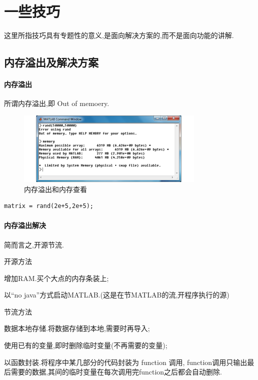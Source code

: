 \section{一些技巧}
这里所指技巧具有专题性的意义,是面向解决方案的,而不是面向功能的讲解.



\subsection{内存溢出及解决方案}

\paragraph{内存溢出}所谓内存溢出,即  Out of memoery.

\begin{figure}[htbp]
\centering
\includegraphics[width=9cm]{diagrams/memoryout.jpg}
\caption{内存溢出和内存查看}
\end{figure}

\vspace{-1.0cm}
\begin{lstlisting}[caption = 生成随机矩阵]
matrix = rand(2e+5,2e+5);
\end{lstlisting}



\paragraph{内存溢出解决}简而言之,开源节流.
\begindot
\item 开源方法
\begin{itemize*}
\item 增加RAM.买个大点的内存条装上;
\item 以“no java”方式启动MATLAB.(这是在节MATLAB的流,开程序执行的源)
\end{itemize*}
\item 节流方法
\begin{itemize*}
\item 数据本地存储.将数据存储到本地,需要时再导入;
\item 使用已有的变量,即时删除临时变量(不再需要的变量);
\item 以函数封装.将程序中某几部分的代码封装为 function 调用, function调用只输出最后需要的数据,其间的临时变量在每次调用完function之后都会自动删除.
\end{itemize*}
\myenddot



